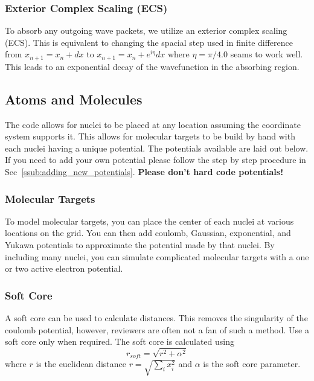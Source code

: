 \documentclass{article}
\begin{document}
\subsubsection{Exterior Complex Scaling (ECS)} %
\label{ssub:exterer_complex_scaling}
To absorb any outgoing wave packets, we utilize an exterior complex scaling (ECS). This is equivalent to changing the spacial step used in finite difference from $x_{n+1} = x_n+dx$ to $x_{n+1} = x_n+e^{i\eta}dx$ where $\eta=\pi / 4.0$ seams to work well. This leads to an exponential decay of the wavefunction in the absorbing region.


\subsection{Atoms and Molecules} %
\label{sub:atoms_and_molecules}
The code allows for nuclei to be placed at any location assuming the coordinate system supports it. This allows for molecular targets to be build by hand with each nuclei having a unique potential. The potentials available are laid out below. If you need to add your own potential please follow the step by step procedure in Sec~\ref{ssub:adding_new_potentials}. \textbf{Please don't hard code potentials!}

\subsubsection{Molecular Targets} %
\label{ssub:molecular_targets}
To model molecular targets, you can place the center of each nuclei at various locations on the grid. You can then add coulomb, Gaussian, exponential, and Yukawa potentials to approximate the potential made by that nuclei. By including many nuclei, you can simulate complicated molecular targets with a one or two active electron potential.

\subsubsection{Soft Core} %
\label{ssub:soft_core_like}
A soft core can be used to calculate distances. This removes the singularity of the coulomb potential, however, reviewers are often not a fan of such a method. Use a soft core only when required. The soft core is calculated using
\begin{equation}
  r_{soft} = \sqrt{r^2 + \alpha^2}
  \label{eq:soft_core}
\end{equation}
where $r$ is the euclidean distance $r=\sqrt{\sum\limits_i x_i^2}$ and $\alpha$ is the soft core parameter.
\end{document}
